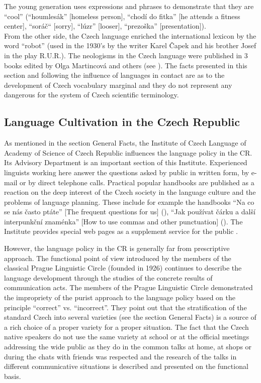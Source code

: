 \begin{multicols}{2}
The young generation uses expressions and phrases to demonstrate that they are “cool” (“houmlesák” {[}homeless person{]}, “chodí do fitka” {[}he attends a fitness center{]}, “soráč“ {[}sorry{]}, “lúzr” {[}looser{]}, “prezoška” {[}presentation{]}).\\
From the other side, the Czech language enriched the international lexicon by the word “robot” (used in the 1930’s by the writer Karel Čapek and his brother Josef in the play R.U.R.).
The neologisms in the Czech language were published in 3 books edited by Olga Martincová and others (see \cite{Martincova_en}).
The facts presented in this section and following the influence of languages in contact are as to the development of Czech vocabulary marginal and they do not represent any dangerous for the system of Czech scientific terminology.

\subsection{Language Cultivation in the Czech Republic}

As mentioned in the section General Facts, the Institute of Czech Language of Academy of Science of Czech Republic influences the language policy in the CR. Its Advisory Department is an important section of this Institute. Experienced linguists working here answer the questions asked by public in written form, by e-mail or by direct telephone calls. Practical popular handbooks are published as a reaction on the deep interest of the Czech society in the language culture and the problems of language planning. These include for example the handbooks “Na co se nás často ptáte” {[}The frequent questions for us{]} (\cite{Cerna}), “Jak používat čárku a další interpunkční znaménka” {[}How to use commas and other punctuation{]} (\cite{Janovec}). The Institute provides special web pages as a supplement service for the public \cite{Note6}.

However, the language policy in the CR is generally far from prescriptive approach. The functional point of view introduced by the members of the classical Prague Linguistic Circle (founded in 1926) continues to describe the language development through the studies of the concrete results of communication acts. The members of the Prague Linguistic Circle demonstrated the impropriety of the purist approach to the language policy based on the principle “correct” vs. “incorrect”.  They point out that the stratification of the standard Czech into several varieties (see the section General Facts) is a source of a rich choice of a proper variety for a proper situation. The fact that the Czech native speakers do not use the same variety at school or at the official meetings addressing the wide public as they do in the common talks at home, at shops or during the chats with friends was respected and the research of the talks in different communicative  situations is described and presented on the functional basis.


\end{multicols}
